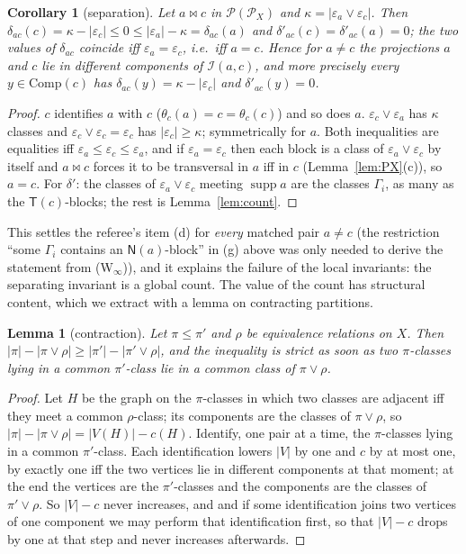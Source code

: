 \documentclass[11pt]{amsart}
\newtheorem{lemma}[theorem]{Lemma}
\newtheorem{corollary}[theorem]{Corollary}
\theoremstyle{definition}
\renewcommand{\P}{\mathcal{P}}
\newcommand{\supp}{\operatorname{supp}}
\newcommand{\T}{\mathsf{T}}
\newcommand{\N}{\mathsf{N}}
\newcommand{\mt}{\bowtie}   %
\begin{document}
\begin{corollary}[separation]\label{cor:acomp}
Let $a\mt c$ in $\P(\P_X)$ and $\kappa=|\varepsilon_a\vee\varepsilon_c|$. Then $\delta_{ac}(c)=\kappa-|\varepsilon_c|\le0\le|\varepsilon_a|-\kappa=\delta_{ac}(a)$ and $\delta'_{ac}(c)=\delta'_{ac}(a)=0$; the two values of $\delta_{ac}$ coincide iff $\varepsilon_a=\varepsilon_c$, i.e.\ iff $a=c$. Hence for $a\ne c$ the projections $a$ and $c$ lie in different components of $\mathcal I(a,c)$, and more precisely every $y\in\mathrm{Comp}(c)$ has $\delta_{ac}(y)=\kappa-|\varepsilon_c|$ and $\delta'_{ac}(y)=0$.
\end{corollary}

\begin{proof}
$c$ identifies $a$ with $c$ ($\theta_c(a)=c=\theta_c(c)$) and so does $a$. $\varepsilon_c\vee\varepsilon_a$ has $\kappa$ classes and $\varepsilon_c\vee\varepsilon_c=\varepsilon_c$ has $|\varepsilon_c|\ge\kappa$; symmetrically for $a$. Both inequalities are equalities iff $\varepsilon_a\le\varepsilon_c\le\varepsilon_a$, and if $\varepsilon_a=\varepsilon_c$ then each block is a class of $\varepsilon_a\vee\varepsilon_c$ by itself and $a\mt c$ forces it to be transversal in $a$ iff in $c$ (Lemma~\ref{lem:PX}(c)), so $a=c$. For $\delta'$: the classes of $\varepsilon_a\vee\varepsilon_c$ meeting $\supp a$ are the classes $\Gamma_i$, as many as the $\T(c)$-blocks; the rest is Lemma~\ref{lem:count}.
\end{proof}

This settles the referee's item (d) for \emph{every} matched pair $a\ne c$ (the restriction ``some $\Gamma_i$ contains an $\N(a)$-block'' in (g) above was only needed to derive the statement from (W$_\infty$)), and it explains the failure of the local invariants: the separating invariant is a global count. The value of the count has structural content, which we extract with a lemma on contracting partitions.

\begin{lemma}[contraction]\label{lem:contr}
Let $\pi\le\pi'$ and $\rho$ be equivalence relations on $X$. Then $|\pi|-|\pi\vee\rho|\ge|\pi'|-|\pi'\vee\rho|$, and the inequality is strict as soon as two $\pi$-classes lying in a common $\pi'$-class lie in a common class of $\pi\vee\rho$.
\end{lemma}

\begin{proof}
Let $H$ be the graph on the $\pi$-classes in which two classes are adjacent iff they meet a common $\rho$-class; its components are the classes of $\pi\vee\rho$, so $|\pi|-|\pi\vee\rho|=|V(H)|-c(H)$. Identify, one pair at a time, the $\pi$-classes lying in a common $\pi'$-class. Each identification lowers $|V|$ by one and $c$ by at most one, by exactly one iff the two vertices lie in different components at that moment; at the end the vertices are the $\pi'$-classes and the components are the classes of $\pi'\vee\rho$. So $|V|-c$ never increases, and and if some identification joins two vertices of one component we may perform that identification first, so that $|V|-c$ drops by one at that step and never increases afterwards.
\end{proof}
\end{document}
